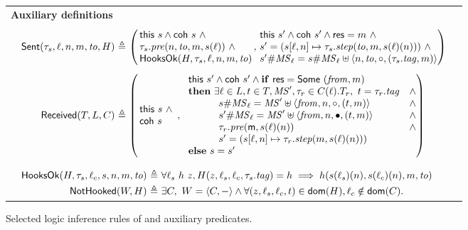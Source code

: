 \begin{figure}[tp]
{\begin{varwidth}{\dimexpr{}\fboxrule\relax}
{{\begin{tabular}{l}
\\
\!\!\textbf{Auxiliary definitions}
\\\\
$
\begin{array}{l}
\begin{array}{r@{\ }c@{\ }l}
\SendEffect(\Trans_s, \lab, n, m, \To, H) &\eqdef &
  \left(\!\!\!\!\!\begin{array}{l@{\!\!,\!}l}
  \begin{array}{l}
    \This{s} \aand \coh~s ~\aand\arcr
    \Trans_s.\prei(n, \To, m, s(\lab)) ~\aand\arcr
    \AllHooksOk{H, \Trans_s, \lab, n, m, \To}
  \end{array}
    &
      \begin{array}{l}
      \This{s'} \aand \coh~s' \aand \res = m  ~\aand \arcr
         s' = (s[\lab, n] \mapsto \Trans_s.\stepi(\To, m,
        s(\lab)(n))) ~\aand \arcr
        s'{\fld}\Msgs_{\lab} = s{\fld}\Msgs_{\lab} \uplus
        \angled{n, \To, \Active, ({\Trans_s}.\tagi, m)}
      \end{array}
  \end{array}\!\!\!\!\!\!\right)
\\\\[-3pt]
\ReceiveEffect(T, L, C) & \eqdef &
\left(\!\!\!\!\!\begin{array}{l@{,\ }l}
  \begin{array}{l}
   \This{s}~\aand \\ \coh~s
  \end{array}
&
\begin{array}{ll}
  \This{s'} \aand \coh~s' \aand
  \ifz~\res = \Some~(\From, m) \arcr
  \thenz~
  \exists \lab \in L, t \in T, \MS', \Trans_r \in
  C(\lab).\Transitions_r,~t = \Trans_r.\tagi &\aand \arcr
  \spb\spa
  s{\fld}\MS_{\lab} = \MS' \join \angled{\From, n, \Active, (t, m)} &\aand \arcr
  \spb\spa
  s'{\fld}\MS_{\lab} = \MS' \join
  \angled{\From, n, \Consumed, (t, m)} &\aand
  \arcr
  \spb\spa \Trans_r.\prei(\msg, s(\lab)(n)) &\aand \arcr
  \spb\spa
  s' = (s[\lab, n] \mapsto \Trans_r.\stepi(m, s(\lab)(n)))
  \arcr
  \elsez~s = s' \arcr
\end{array}
\end{array}\!\!\!\!\!\!\right)
\end{array}
\\\\
\begin{array}{r@{\ }c@{\ }l}
\AllHooksOk{H, \Trans_s, \lab_c, s, n, m, \tto} &\eqdef & \forall
\lab_s~h~z, H(z, \lab_s, \lab_c, \Trans_s.\tagi) =
h \implies h (s(\lab_s)(n), s(\lab_c)(n), m, \To)
\\[3pt]
\NotHooked{W, H} & \eqdef & \exists C,~W = \angled{C, -} \aand
\forall (z, \lab_s, \lab_c, t) \in \dom{H}, \lab_c \notin \dom{C}.
\end{array}
\end{array}
$
\end{tabular}
}}
\end{varwidth}}
\caption{Selected logic inference rules of \disel and auxiliary
  predicates.}
\label{fig:semass}
\end{figure}

